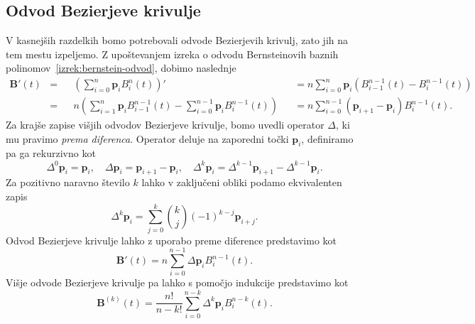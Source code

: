 \documentclass[isrm2, tisk]{fmfdelo}
\newcommand{\p}{\mathbf{p}}
\begin{document}
    \subsection{Odvod Bezierjeve krivulje}
    V kasnejših razdelkih bomo potrebovali odvode Bezierjevih krivulj, zato jih na tem mestu izpeljemo.
    Z upoštevanjem izreka o odvodu Bernsteinovih baznih polinomov~\ref{izrek:bernstein-odvod}, dobimo naslednje
    \begin{align*}
        \mathbf{B}'(t) &=   &   &\left(\sum_{i=0}^{n}\p_{i}B_i^n(t)\right)' & & =n \sum_{i=0}^{n}\p_{i}\left(B_{i-1}^{n-1}(t) - B_i^{n-1}(t)\right) \\
        &=            &  &n \left( \sum_{i=1}^{n}\p_{i}B_{i-1}^{n-1}(t) - \sum_{i=0}^{n-1}\p_{i}B_i^{n-1}(t)\right) & &= n \sum_{i=0}^{n-1}(\p_{i+1}-\p_{i})B_i^{n-1}(t).
    \end{align*}
    Za krajše zapise višjih odvodov Bezierjeve krivulje, bomo uvedli operator $\Delta$, ki mu pravimo \textit{prema diferenca}.
    Operator deluje na zaporedni točki $\p_i$, definiramo pa ga rekurzivno kot
     \[\Delta^0\p_i=\p_i,\quad \Delta\p_i=\p_{i+1}-\p_{i}, \quad \Delta^k\p_i=\Delta^{k-1}\p_{i+1}-\Delta^{k-1}\p_{i}.\]
    Za pozitivno naravno število $k$ lahko v zaključeni obliki podamo ekvivalenten zapis
    \[ \Delta^k\p_i= \sum_{j=0}^k\binom{k}{j}(-1)^{k-j}\p_{i+j}.\]
    Odvod Bezierjeve krivulje lahko z uporabo preme diference predstavimo kot
    \[ \mathbf{B}'(t) =  n \sum_{i=0}^{n-1}\Delta\p_{i}B_i^{n-1}(t).\]
    Višje odvode Bezierjeve krivulje pa lahko s pomočjo indukcije predstavimo kot \[ \mathbf{B}^{(k)}(t) = \frac{n!}{n-k!} \sum_{i=0}^{n-k}\Delta^{k}\p_{i}B_i^{n-k}(t). \]
\end{document}

